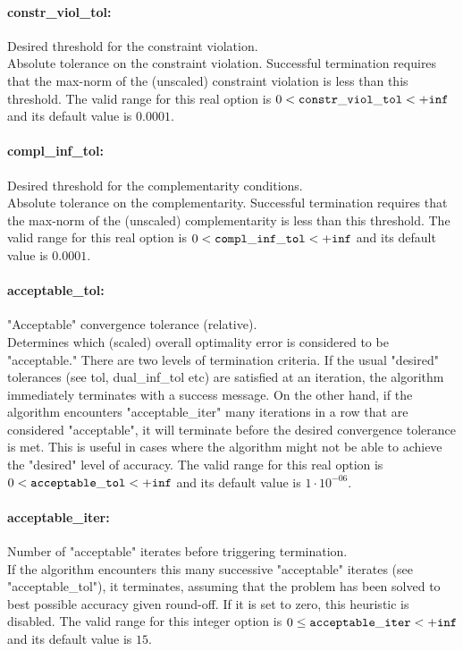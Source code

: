 \paragraph{constr\_viol\_tol:}\label{opt:constr_viol_tol} Desired threshold for the constraint violation. \\
 Absolute tolerance on the constraint violation. Successful termination requires that the max-norm of the (unscaled) constraint violation is less than this threshold. The valid range for this real option is 
$0 <  {\tt constr\_viol\_tol } <  {\tt +inf}$
and its default value is $0.0001$.


\paragraph{compl\_inf\_tol:}\label{opt:compl_inf_tol} Desired threshold for the complementarity conditions. \\
 Absolute tolerance on the complementarity. Successful termination requires that the max-norm of the (unscaled) complementarity is less than this threshold. The valid range for this real option is 
$0 <  {\tt compl\_inf\_tol } <  {\tt +inf}$
and its default value is $0.0001$.


\paragraph{acceptable\_tol:}\label{opt:acceptable_tol} "Acceptable" convergence tolerance (relative). \\
 Determines which (scaled) overall optimality error is considered to be "acceptable." There are two levels of termination criteria.  If the usual "desired" tolerances (see tol, dual\_inf\_tol etc) are satisfied at an iteration, the algorithm immediately terminates with a success message.  On the other hand, if the algorithm encounters "acceptable\_iter" many iterations in a row that are considered "acceptable", it will terminate before the desired convergence tolerance is met. This is useful in cases where the algorithm might not be able to achieve the "desired" level of accuracy. The valid range for this real option is 
$0 <  {\tt acceptable\_tol } <  {\tt +inf}$
and its default value is $1 \cdot 10^{-06}$.


\paragraph{acceptable\_iter:}\label{opt:acceptable_iter} Number of "acceptable" iterates before triggering termination. \\
 If the algorithm encounters this many successive "acceptable" iterates (see "acceptable\_tol"), it terminates, assuming that the problem has been solved to best possible accuracy given round-off.  If it is set to zero, this heuristic is disabled. The valid range for this integer option is
$0 \le {\tt acceptable\_iter } <  {\tt +inf}$
and its default value is $15$.


